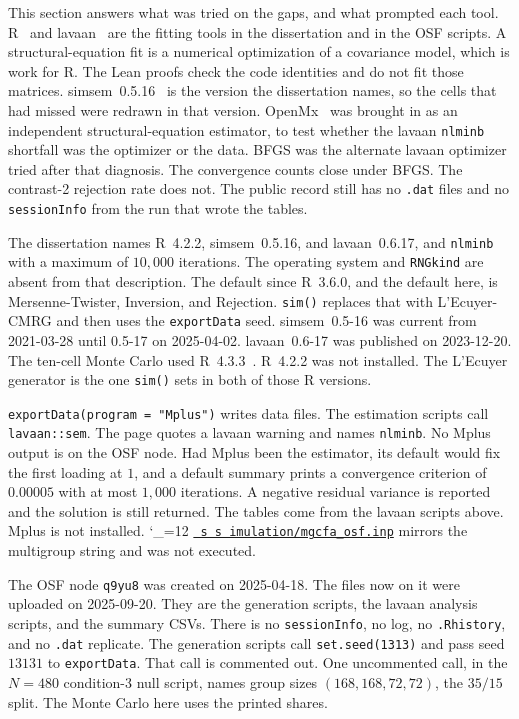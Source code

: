 \documentclass[11pt]{article}
\makeatletter
\newcommand{\proofbase}{https://github.com/alectionary/vibe-math/blob/master/formalization/latent-contrasts}
\def\latent@show#1{%
  \ifx\relax#1\else
    #1\allowbreak
    \expandafter\latent@show
  \fi}
\newcommand{\src}{\begingroup\catcode`\_=12 \latent@src}
\newcommand{\latent@src}[1]{%
  \edef\srcurl{\proofbase/#1}%
  \href{\srcurl}{\texttt{\latent@show#1\relax}}\endgroup}
\makeatother
\begin{document}
This section answers what was tried on the gaps, and what prompted each
tool.
R~\cite{rcore} and lavaan~\cite{rosseel2012} are the fitting tools in the dissertation and in the OSF
scripts. A structural-equation fit is a numerical optimization of a
covariance model, which is work for R. The Lean proofs check the code
identities and do not fit those matrices.
simsem~0.5.16~\cite{simsem} is the version the dissertation names, so the cells that
had missed were redrawn in that version.
OpenMx~\cite{neale2016} was brought in as an independent structural-equation estimator,
to test whether the lavaan \texttt{nlminb} shortfall was the optimizer
or the data.
BFGS was the alternate lavaan optimizer tried after that diagnosis.
The convergence counts close under BFGS.
The contrast-2 rejection rate does not.
The public record still has no \texttt{.dat} files and no
\texttt{sessionInfo} from the run that wrote the tables.

The dissertation names R~4.2.2, simsem~0.5.16, and lavaan~0.6.17, and
\texttt{nlminb} with a maximum of \(10{,}000\) iterations. The operating
system and \texttt{RNGkind} are absent from that description. The
default since R~3.6.0, and the default here, is Mersenne-Twister,
Inversion, and Rejection. \texttt{sim()} replaces that with
L'Ecuyer-CMRG and then uses the \texttt{exportData} seed.
simsem~0.5-16 was current from 2021-03-28 until 0.5-17 on 2025-04-02.
lavaan~0.6-17 was published on 2023-12-20. The ten-cell Monte Carlo
used R~4.3.3~\cite{rcore}. R~4.2.2 was not installed. The L'Ecuyer generator is the
one \texttt{sim()} sets in both of those R versions.

\texttt{exportData(program = "Mplus")} writes data files. The
estimation scripts call \texttt{lavaan::sem}. The page quotes a lavaan
warning and names \texttt{nlminb}. No Mplus output is on the OSF node.
Had Mplus been the estimator, its default would fix the first loading
at \(1\), and a default summary prints a convergence criterion of
\(0.00005\) with at most \(1{,}000\) iterations. A negative residual
variance is reported and the solution is still returned. The tables
come from the lavaan scripts above. Mplus is not installed.
\src{simulation/mgcfa_osf.inp} mirrors the multigroup string and was
not executed.

The OSF node \texttt{q9yu8} was created on 2025-04-18. The files now on
it were uploaded on 2025-09-20. They are the generation scripts, the
lavaan analysis scripts, and the summary CSVs. There is no
\texttt{sessionInfo}, no log, no \texttt{.Rhistory}, and no
\texttt{.dat} replicate. The generation scripts call
\texttt{set.seed(1313)} and pass seed \(13131\) to \texttt{exportData}.
That call is commented out. One uncommented call, in the \(N=480\)
condition-3 null script, names group sizes \((168,168,72,72)\), the
\(35/15\) split. The Monte Carlo here uses the printed shares.
\end{document}
